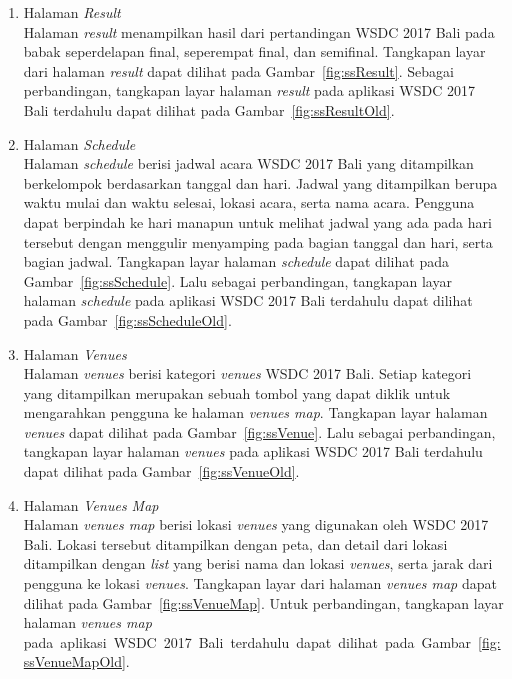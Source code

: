 \begin{enumerate}
	\item Halaman \textit{Result} \\
		Halaman \textit{result} menampilkan hasil dari pertandingan WSDC 2017 Bali pada babak seperdelapan final, seperempat final, dan semifinal. Tangkapan layar dari halaman \textit{result} dapat dilihat pada Gambar~\ref{fig:ssResult}. Sebagai perbandingan, tangkapan layar halaman \textit{result} pada aplikasi WSDC 2017 Bali terdahulu dapat dilihat pada Gambar~\ref{fig:ssResultOld}.
		
	\item Halaman \textit{Schedule} \\
		Halaman \textit{schedule} berisi jadwal acara WSDC 2017 Bali yang ditampilkan berkelompok berdasarkan tanggal dan hari. Jadwal yang ditampilkan berupa waktu mulai dan waktu selesai, lokasi acara, serta nama acara. Pengguna dapat berpindah ke hari manapun untuk melihat jadwal yang ada pada hari tersebut dengan menggulir menyamping pada bagian tanggal dan hari, serta bagian jadwal. Tangkapan layar halaman \textit{schedule} dapat dilihat pada Gambar~\ref{fig:ssSchedule}. Lalu sebagai perbandingan, tangkapan layar halaman \textit{schedule} pada aplikasi WSDC 2017 Bali terdahulu dapat dilihat pada Gambar~\ref{fig:ssScheduleOld}.
		
	\item Halaman \textit{Venues} \\
		Halaman \textit{venues} berisi kategori \textit{venues} WSDC 2017 Bali. Setiap kategori yang ditampilkan merupakan sebuah tombol yang dapat diklik untuk mengarahkan pengguna ke halaman \textit{venues map}. Tangkapan layar halaman \textit{venues} dapat dilihat pada Gambar~\ref{fig:ssVenue}. Lalu sebagai perbandingan, tangkapan layar halaman \textit{venues} pada aplikasi WSDC 2017 Bali terdahulu dapat dilihat pada Gambar~\ref{fig:ssVenueOld}.
		
	\item Halaman \textit{Venues Map} \\
		Halaman \textit{venues map} berisi lokasi \textit{venues} yang digunakan oleh WSDC 2017 Bali. Lokasi tersebut ditampilkan dengan peta, dan detail dari lokasi ditampilkan dengan \textit{list} yang berisi nama dan lokasi \textit{venues}, serta jarak dari pengguna ke lokasi \textit{venues}. Tangkapan layar dari halaman \textit{venues map} dapat dilihat pada Gambar~\ref{fig:ssVenueMap}. Untuk perbandingan, tangkapan layar halaman \textit{venues map} pada~aplikasi~WSDC~2017~Bali~terdahulu~dapat~dilihat~pada~Gambar~\ref{fig:ssVenueMapOld}.

	
\end{enumerate}

